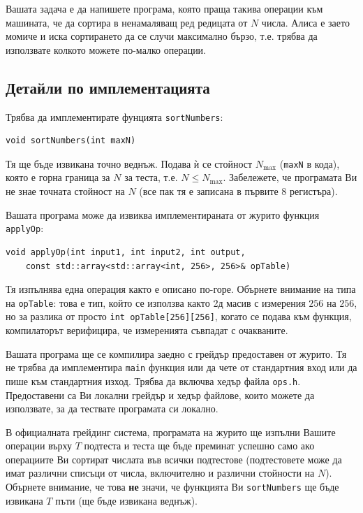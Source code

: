 \documentclass[12pt]{article}
\begin{document}
Вашата задача е да напишете програма, която праща такива операции към машината, че да сортира в ненамаляващ ред редицата от $N$ числа. Алиса е заето момиче и иска сортирането да се случи максимално бързо, т.е. трябва да използвате колкото можете по-малко операции.

\subsection{Детайли по имплементацията}

Трябва да имплементирате фунцията \verb|sortNumbers|:

\begin{verbatim}
void sortNumbers(int maxN)
\end{verbatim}

Тя ще бъде извикана точно веднъж.
Подава ѝ се стойност $N_\mathrm{max}$ (\verb|maxN| в кода), която е горна граница за $N$ за теста, т.е. $N \leq N_\mathrm{max}$.
Забележете, че програмата Ви не знае точната стойност на $N$ (все пак тя е записана в първите $8$ регистъра).

Вашата програма може да извиква имплементираната от журито функция \verb|applyOp|:

\begin{verbatim}
void applyOp(int input1, int input2, int output,
    const std::array<std::array<int, 256>, 256>& opTable)
\end{verbatim}

Тя изпълнява една операция както е описано по-горе.
Обърнете внимание на типа на \verb|opTable|: това е тип, който се използва както 2д масив с измерения $256$ на $256$,
но за разлика от просто \verb|int opTable[256][256]|, когато се подава към функция,
компилаторът верифицира, че измеренията съвпадат с очакваните.

Вашата програма ще се компилира заедно с грейдър предоставен от журито. Тя не трябва да имплементира \verb|main| функция или да чете от стандартния вход или да пише към стандартния изход. Трябва да включва хедър файла \verb|ops.h|. Предоставени са Ви локални грейдър и хедър файлове, които можете да използвате, за да тествате програмата си локално.

В официалната грейдинг система, програмата на журито ще изпълни Вашите операции върху $T$ подтеста и теста ще бъде преминат успешно само ако операциите Ви сортират числата във всички подтестове (подтестовете може да имат различни списъци от числа, включително и различни стойности на $N$). Обърнете внимание, че това \textbf{не} значи, че функцията Ви \verb|sortNumbers| ще бъде извикана $T$ пъти (ще бъде извикана веднъж).
\end{document}
